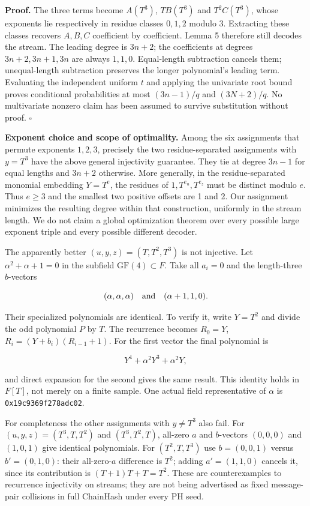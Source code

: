 \documentclass[
  11pt,
]{article}
\begin{document}
\textbf{Proof.} The three terms become \(A(T^3)\), \(T B(T^3)\) and
\(T^2 C(T^3)\), whose exponents lie respectively in residue classes
\(0,1,2\) modulo 3. Extracting these classes recovers \(A,B,C\)
coefficient by coefficient. Lemma 5 therefore still decodes the stream.
The leading degree is \(3n+2\); the coefficients at degrees
\(3n+2,3n+1,3n\) are always \(1,1,0\). Equal-length subtraction cancels
them; unequal-length subtraction preserves the longer polynomial's
leading term. Evaluating the independent uniform \(t\) and applying the
univariate root bound proves conditional probabilities at most
\((3n-1)/q\) and \((3N+2)/q\). No multivariate nonzero claim has been
assumed to survive substitution without proof. \(\square\)

\textbf{Exponent choice and scope of optimality.} Among the six
assignments that permute exponents \(1,2,3\), precisely the two
residue-separated assignments with \(y=T^3\) have the above general
injectivity guarantee. They tie at degree \(3n-1\) for equal lengths and
\(3n+2\) otherwise. More generally, in the residue-separated monomial
embedding \(Y=T^e\), the residues of \(1,T^{e_u},T^{e_z}\) must be
distinct modulo \(e\). Thus \(e\ge3\) and the smallest two positive
offsets are 1 and 2. Our assignment minimizes the resulting degree
within that construction, uniformly in the stream length. We do not
claim a global optimization theorem over every possible large exponent
triple and every possible different decoder.

The apparently better \((u,y,z)=(T,T^2,T^3)\) is not injective. Let
\(\alpha^2+\alpha+1=0\) in the subfield \(\mathrm{GF}(4)\subset F\).
Take all \(a_i=0\) and the length-three \(b\)-vectors

\[ (\alpha,\alpha,\alpha)\quad\hbox{and}\quad(\alpha+1,1,0). \]

Their specialized polynomials are identical. To verify it, write
\(Y=T^2\) and divide the odd polynomial \(P\) by \(T\). The recurrence
becomes \(R_0=Y\), \(R_i=(Y+b_i)(R_{i-1}+1)\). For the first vector the
final polynomial is

\[Y^4+\alpha^2Y^3+\alpha^2Y,\]

and direct expansion for the second gives the same result. This identity
holds in \(F[T]\), not merely on a finite sample. One actual field
representative of \(\alpha\) is \texttt{0x19c9369f278adc02}.

For completeness the other assignments with \(y\ne T^3\) also fail. For
\((u,y,z)=(T^3,T,T^2)\) and \((T^3,T^2,T)\), all-zero \(a\) and
\(b\)-vectors \((0,0,0)\) and \((1,0,1)\) give identical polynomials.
For \((T^2,T,T^3)\) use \(b=(0,0,1)\) versus \(b'=(0,1,0)\): their
all-zero-\(a\) difference is \(T^2\); adding \(a'=(1,1,0)\) cancels it,
since its contribution is \((T+1)T+T=T^2\). These are counterexamples to
recurrence injectivity on streams; they are not being advertised as
fixed message-pair collisions in full ChainHash under every PH seed.
\end{document}
